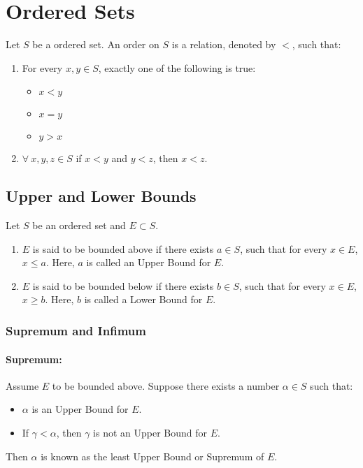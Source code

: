 \documentclass[12pt, oneside]{book}
\begin{document}
\section{Ordered Sets}
Let \(S\) be a ordered set.
An order on \(S\) is a relation, denoted by \(<\), such that:
\begin{enumerate}
    \item For every \(x,y \in S\), exactly one of the following is true:
    \begin{itemize}
        \item \(x < y\)
        \item \(x = y\)
        \item \(y > x\)
    \end{itemize}
    \item \(\forall \: x,y,z \in S\) if \(x < y\) and \(y < z\), then \(x < z\).
\end{enumerate}

\subsection{Upper and Lower Bounds}
Let \(S\) be an ordered set and \(E \subset S\).
\begin{enumerate}
    \item \(E\) is said to be bounded above if there exists \( a \in S \), such that for every \( x \in E \), \( x \leq a \). Here, \(a\) is called an Upper Bound for \(E\).
    \item \(E\) is said to be bounded below if there exists \( b \in S \), such that for every \( x \in E \), \( x \geq b \). Here, \(b\) is called a Lower Bound for \(E\).
\end{enumerate}

\subsubsection{Supremum and Infimum}
\paragraph{Supremum:} Assume \(E\) to be bounded above.
Suppose there exists a number \(\alpha \in S\) such that:
\begin{itemize}
    \item \(\alpha\) is an Upper Bound for \(E\).
    \item If \(\gamma < \alpha\), then \(\gamma\) is not an Upper Bound for \(E\).
\end{itemize}
Then \( \alpha \) is known as the least Upper Bound or Supremum of \(E\).
\end{document}
